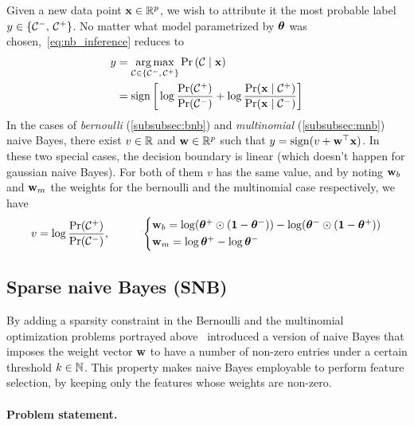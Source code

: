 Given a new data point $\mathbf{x} \in \mathbb{R}^p$, we wish to attribute it the most probable label
$y \in \left\{ \mathcal{C}^-,\, \mathcal{C}^+ \right\}$.
No matter what model parametrized by $\bm{\theta}$ was chosen,~\ref{eq:nb_inference} reduces to
\begin{align*}
    y &= \underset{\mathcal{C} \in \left\{ \mathcal{C}^-,\, \mathcal{C}^+ \right\}}{\operatorname*{arg\,max}} \Pr\left( \mathcal{C} \mid \mathbf{x} \right)\\
    &= \operatorname*{sign}\bigg[\log \frac{\Pr(\mathcal{C}^+)}{\Pr(\mathcal{C}^-)}
        + \log \frac{\Pr(\mathbf{x} \mid \mathcal{C}^+)}{\Pr(\mathbf{x} \mid \mathcal{C}^-)}\bigg]
\end{align*}
In the cases of \emph{bernoulli} (\ref{subsubsec:bnb}) and \emph{multinomial} (\ref{subsubsec:mnb}) naive Bayes,
there exist $v \in \mathbb{R}$ and $\mathbf{w} \in \mathbb{R}^p$ such that $y = \operatorname*{sign}(v + \mathbf{w}^\top\mathbf{x})$.
In these two special cases, the decision boundary is linear (which doesn't happen for gaussian naive Bayes).
For both of them $v$ has the same value, and by noting $\mathbf{w}_b$ and $\mathbf{w}_m$ the weights for the bernoulli
and the multinomial case respectively, we have
\begin{equation*}
    v = \log\frac{\Pr(\cC^+)}{\Pr(\cC^-)}
    ,\qquad\quad
    \begin{cases*}
        \ww_b = \log(\btheta^+\odot(\1 - \btheta^-)) - \log(\btheta^-\odot(\1 - \btheta^+))\\
        \ww_m = \log\btheta^+ - \log\btheta^-
    \end{cases*}
\end{equation*}

\subsection{Sparse naive Bayes (SNB)}\label{subsec:snb}

By adding a sparsity constraint in the Bernoulli
and the multinomial optimization problems portrayed above~\cite{sparse_naive_bayes}
introduced a version of naive Bayes that imposes the weight vector $\mathbf{w}$
to have a number of non-zero entries under a certain threshold $k \in \mathbb{N}$.
This property makes naive Bayes employable to perform feature selection,
by keeping only the features whose weights are non-zero.

\paragraph{Problem statement.}\label{subsubsec:snb_ps}

